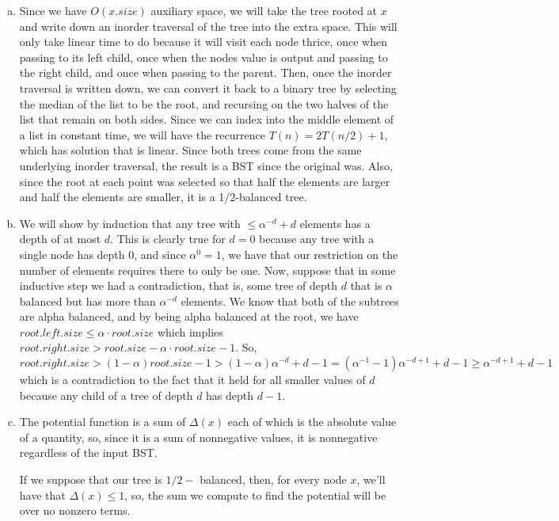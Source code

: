 \documentclass{article}
\begin{document}
\begin{enumerate}[a.]
\item
Since we have $O(x.size)$ auxiliary space, we will take the tree rooted at $x$ and write down an inorder traversal of the tree into the extra space. This will only take linear time to do because it will visit each node thrice, once when passing to its left child, once when the nodes value is output and passing to the right child, and once when passing to the parent. Then, once the inorder traversal is written down, we can convert it back to a binary tree by selecting the median of the list to be the root, and recursing on the two halves of the list that remain on both sides. Since we can index into the middle element of a list in constant time, we will have the recurrence $T(n) = 2T(n/2) +1$, which has solution that is linear. Since both trees come from the same underlying inorder traversal, the result is a BST since the original was. Also, since the root at each point was selected so that half the elements are larger and half the elements are smaller, it is a 1/2-balanced tree.
\item
We will show by induction that any tree with $\le \alpha^{-d}+d$ elements has a depth of at most $d$. This is clearly true for $d=0$ because any tree with a single node has depth 0, and since $\alpha^0 = 1$, we have that our restriction on the number of elements requires there to only be one. Now, suppose that in some inductive step we had a contradiction, that is, some tree of depth $d$ that is $\alpha$ balanced but has more than $\alpha^{-d}$ elements. We know that both of the subtrees are alpha balanced, and by being alpha balanced at the root, we have $root.left.size \le \alpha \cdot root.size$ which implies $root.right.size > root.size - \alpha \cdot root.size -1$. So, $root.right.size > (1-\alpha) root.size -1 > (1-\alpha) \alpha^{-d} + d-1 = (\alpha^{-1} -1)\alpha^{-d+1} + d-1 \ge \alpha^{-d+1}+d-1$ which is a contradiction to the fact that it held for all smaller values of $d$ because any child of a tree of depth $d$ has depth $d-1$.  
 \item
The potential function is a sum of $\Delta(x)$ each of which is the absolute value of a quantity, so, since it is a sum of nonnegative values, it is nonnegative regardless of the input BST.

If we suppose that our tree is $1/2-$ balanced, then, for every node $x$, we'll have that $\Delta(x) \le 1$, so, the sum we compute to find the potential will be over no nonzero terms.
 

\end{enumerate}
\end{document}
